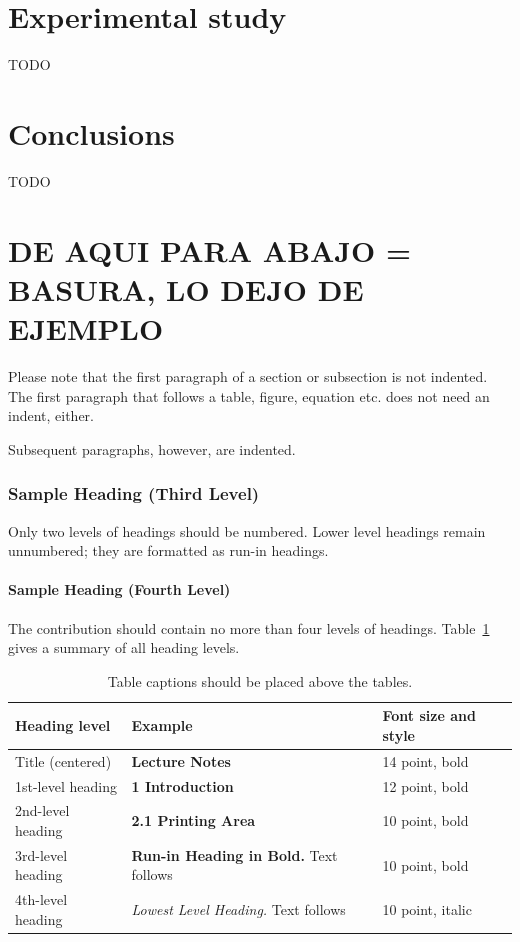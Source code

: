 \documentclass[runningheads]{llncs}
\begin{document}
\section{Experimental study}
TODO

\section{Conclusions}
TODO

\section{DE AQUI PARA ABAJO = BASURA, LO DEJO DE EJEMPLO}
Please note that the first paragraph of a section or subsection is
not indented. The first paragraph that follows a table, figure,
equation etc. does not need an indent, either.

Subsequent paragraphs, however, are indented.

\subsubsection{Sample Heading (Third Level)} Only two levels of
headings should be numbered. Lower level headings remain unnumbered;
they are formatted as run-in headings.

\paragraph{Sample Heading (Fourth Level)}
The contribution should contain no more than four levels of
headings. Table~\ref{tab1} gives a summary of all heading levels.

\begin{table}
\caption{Table captions should be placed above the
tables.}\label{tab1}
\begin{tabular}{|l|l|l|}
\hline
Heading level &  Example & Font size and style\\
\hline
Title (centered) &  {\Large\bfseries Lecture Notes} & 14 point, bold\\
1st-level heading &  {\large\bfseries 1 Introduction} & 12 point, bold\\
2nd-level heading & {\bfseries 2.1 Printing Area} & 10 point, bold\\
3rd-level heading & {\bfseries Run-in Heading in Bold.} Text follows & 10 point, bold\\
4th-level heading & {\itshape Lowest Level Heading.} Text follows & 10 point, italic\\
\hline
\end{tabular}
\end{table}
\end{document}
